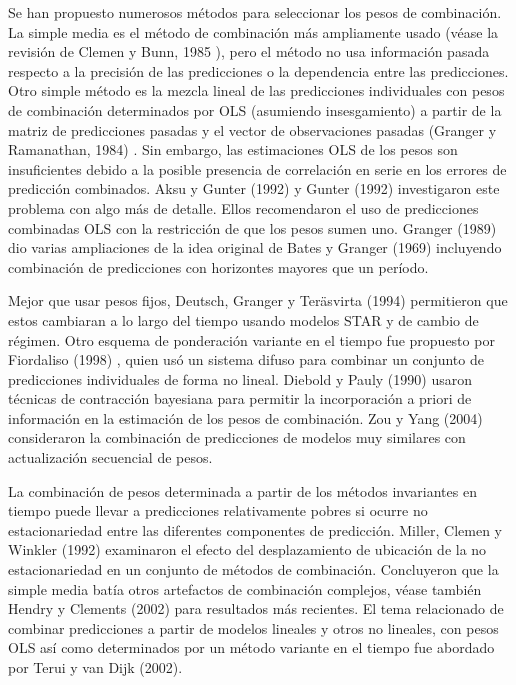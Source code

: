 \documentclass{llncs}
\begin{document}
Se han propuesto numerosos métodos para seleccionar los pesos de combinación. La simple media es el método de combinación más ampliamente usado (véase la revisión de Clemen y Bunn, 1985 \cite{Bunn1985151}), pero el método no usa información pasada respecto a la precisión de las predicciones o la dependencia entre las predicciones. Otro simple método es la mezcla lineal de las predicciones individuales con pesos de combinación determinados por OLS (asumiendo insesgamiento) a partir de la matriz de predicciones pasadas y el vector de observaciones pasadas (Granger y Ramanathan, 1984) \cite{Granger1984197}. Sin embargo, las estimaciones OLS de los pesos son insuficientes debido a la posible presencia de correlación en serie en los errores de predicción combinados. Aksu y Gunter (1992) \cite{Aksu199227} y Gunter (1992) \cite{Gunter199245} investigaron este problema con algo más de detalle. Ellos recomendaron el uso de predicciones combinadas OLS con la restricción de que los pesos sumen uno. Granger (1989) \cite{Granger1989167} dio varias ampliaciones de la idea original de Bates y Granger (1969) \cite{BATESJM1969451} incluyendo combinación de predicciones con horizontes mayores que un período.

Mejor que usar pesos fijos, Deutsch, Granger y Teräsvirta (1994) \cite{Deutsch199447} permitieron que estos cambiaran a lo largo del tiempo usando modelos STAR y de cambio de régimen. Otro esquema de ponderación variante en el tiempo fue propuesto por Fiordaliso (1998) \cite{Fiordaliso1998367}, quien usó un sistema difuso para combinar un conjunto de predicciones individuales de forma no lineal. Diebold y Pauly (1990) \cite{Diebold1990503} usaron técnicas de contracción bayesiana para permitir la incorporación a priori de información en la estimación de los pesos de combinación. Zou y Yang (2004) \cite{Zou200469} consideraron la combinación de predicciones de modelos muy similares con actualización secuencial de pesos.

La combinación de pesos determinada a partir de los métodos invariantes en tiempo puede llevar a predicciones relativamente pobres si ocurre no estacionariedad entre las diferentes componentes de predicción. Miller, Clemen y Winkler (1992) \cite{Miller1992515} examinaron el efecto del desplazamiento de ubicación de la no estacionariedad en un conjunto de  métodos de combinación. Concluyeron que la simple media batía otros artefactos de combinación complejos, véase también Hendry y Clements (2002) \cite{Hendry20021} para resultados más recientes. El tema relacionado de combinar predicciones a partir de modelos lineales y otros no lineales, con pesos OLS  así como determinados por un método variante en el tiempo fue abordado por Terui y van Dijk (2002)\cite{Terui2002421}.
\end{document}
